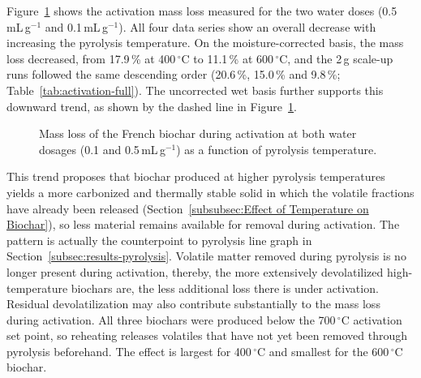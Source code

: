 Figure~\ref{fig:activation-massloss} shows the activation mass loss measured for the two water doses (0.5\,mL\,g$^{-1}$ and 0.1\,mL\,g$^{-1}$). All four data series show an overall decrease with increasing the pyrolysis temperature. On the moisture-corrected basis, the mass loss decreased, from 17.9\,\% at 400\,$^{\circ}$C to 11.1\,\% at 600\,$^{\circ}$C, and the 2\,g scale-up runs followed the same descending order (20.6\,\%, 15.0\,\% and 9.8\,\%; Table~\ref{tab:activation-full}). The uncorrected wet basis further supports this downward trend, as shown by the dashed line in Figure~\ref{fig:activation-massloss}.

\begin{figure}[ht]
\centering
{}
\caption{Mass loss of the French biochar during activation at both water dosages (0.1 and
0.5\,mL\,g$^{-1}$) as a function of pyrolysis temperature.}
\label{fig:activation-massloss}
\end{figure}

This trend proposes that biochar produced at higher pyrolysis temperatures yields a more carbonized and thermally stable solid in which the volatile fractions have already been released (Section~\ref{subsubsec:Effect of Temperature on Biochar}), so less material remains available for removal during activation. The pattern is actually the counterpoint to pyrolysis line graph in Section~\ref{subsec:results-pyrolysis}. Volatile matter removed during pyrolysis is no longer present during activation, thereby, the more extensively devolatilized high-temperature biochars are, the less additional loss there is under activation. Residual devolatilization may also contribute substantially to the mass loss during activation. All three biochars were produced below the 700\,$^{\circ}$C activation set point, so reheating releases volatiles that have not yet been removed through pyrolysis beforehand. The effect is largest for 400\,$^{\circ}$C and smallest for the 600\,$^{\circ}$C biochar.

